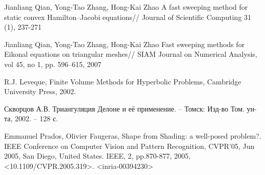 \begin{thebibliography}{99}
 {Jianliang Qian, Yong-Tao Zhang, Hong-Kai Zhao} A
  fast sweeping method for static convex Hamilton–Jacobi equations//
  Journal of Scientific Computing 31 (1), 237-271
  
 {Jianliang Qian, Yong-Tao Zhang, Hong-Kai Zhao} Fast
  sweeping methods for Eikonal equations on triangular meshes// SIAM
  Journal on Numerical Analysis, vol 45, no 1, pp. 596–615, 2007
  

 {R.J. Leveque}, Finite Volume Methods for Hyperbolic Problems, Cambridge
University Press, 2002.

 {Скворцов А.В.} Триангуляция Делоне и её применение. –
  Томск: Изд-во Том. ун-та, 2002. – 128 с.

 {Emmanuel Prados, Olivier Faugeras}, Shape from Shading: a well-posed problem?. IEEE Conference
on Computer Vision and Pattern Recognition, CVPR’05, Jun 2005, San Diego, United States. IEEE,
2, pp.870-877, 2005, <10.1109/CVPR.2005.319>. <inria-00394230>

  
\end{thebibliography}



